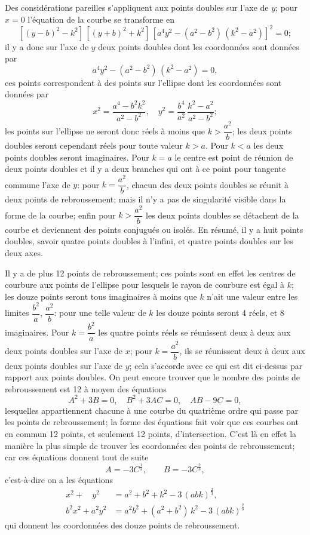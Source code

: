 \documentclass[11pt,a4paper]{book}
\begin{document}
\newpage
Des consid\'{e}rations pareilles s'appliquent aux points doubles sur l'axe de $y$; pour $x=0$ l'\'{e}quation de la courbe se transforme en
\[
[(y-b)^2-k^2]\,[(y+b)^2+k^2]\,[a^4y^2-(a^2-b^2)\,(k^2-a^2)]^2 = 0;
\]
il y a donc sur l'axe de $y$ deux points doubles dont les coordonn\'{e}es sont donn\'{e}es par
\[
a^4y^2 - (a^2-b^2)\,(k^2-a^2) = 0,
\]
ces points correspondent \`{a} des points sur l'ellipse dont les coordonn\'{e}es sont donn\'{e}es par
\[
x^2 = \frac{a^4-b^2k^2}{a^2-b^2}, \quad y^2 = \frac{b^4}{a^2}\,\frac{k^2-a^2}{a^2-b^2};
\]
les points sur l'ellipse ne seront donc r\'{e}els \`{a} moins que $k > \dfrac{a^2}{b}$; les deux points doubles seront cependant r\'{e}els pour toute valeur $k > a$. Pour $k < a$ les deux points doubles seront imaginaires. Pour $k=a$ le centre est point de r\'{e}union de deux points doubles et il y a deux branches qui ont \`{a} ce point pour tangente commune l'axe de $y$: pour $k = \dfrac{a^2}{b}$, chacun des deux points doubles se r\'{e}unit \`{a} deux points de rebroussement; mais il n'y a pas de singularit\'{e} visible dans la forme de la courbe; enfin pour $k > \dfrac{a^2}{b}$ les deux points doubles se d\'{e}tachent de la courbe et deviennent des points conjugu\'{e}s ou isol\'{e}s. En r\'{e}sum\'{e}, il y a huit points doubles, savoir quatre points doubles \`{a} l'infini, et quatre points doubles sur les deux axes.

Il y a de plus 12 points de rebroussement; ces points sont en effet les centres de courbure aux points de l'ellipse pour lesquels le rayon de courbure est \'{e}gal \`{a} $k$; les douze points seront tous imaginaires \`{a} moins que $k$ n'ait une valeur entre les limites $\dfrac{b^2}{a}$, $\dfrac{a^2}{b}$: pour une telle valeur de $k$ les douze points seront 4 r\'{e}els, et 8 imaginaires. Pour $k = \dfrac{b^2}{a}$ les quatre points r\'{e}els se r\'{e}unissent deux \`{a} deux aux deux points doubles sur l'axe de $x$; pour $k = \dfrac{a^2}{b}$, ils se r\'{e}unissent deux \`{a} deux aux deux points doubles sur l'axe de $y$; cela s'accorde avec ce qui est dit ci-dessus par rapport aux points doubles. On peut encore trouver que le nombre des points de rebroussement est 12 \`{a} moyen des \'{e}quations
\[
A^2 + 3B = 0, \quad B^2 + 3AC = 0, \quad AB - 9C = 0,
\]
lesquelles appartiennent chacune \`{a} une courbe du quatri\`{e}me ordre qui passe par les points de rebroussement; la forme des \'{e}quations fait voir que ces courbes ont en commun 12 points, et seulement 12 points, d'intersection. C'est l\`{a} en effet la mani\`{e}re la plus simple de trouver les coordonn\'{e}es des points de rebroussement; car ces \'{e}quations donnent tout de suite
\[
A = -3C^{\frac{1}{3}}, \qquad B = -3C^{\frac{2}{3}},
\]
c'est-\`{a}-dire on a les \'{e}quations
\begin{align*}
x^2 + \phantom{a^2}y^2 &= a^2 + b^2 + k^2 - 3\,(abk)^{\frac{2}{3}}, \\
b^2x^2 + a^2y^2 &= a^2b^2 + (a^2+b^2)\,k^2 - 3\,(abk)^{\frac{2}{3}}
\end{align*}
qui donnent les coordonn\'{e}es des douze points de rebroussement.
\end{document}
